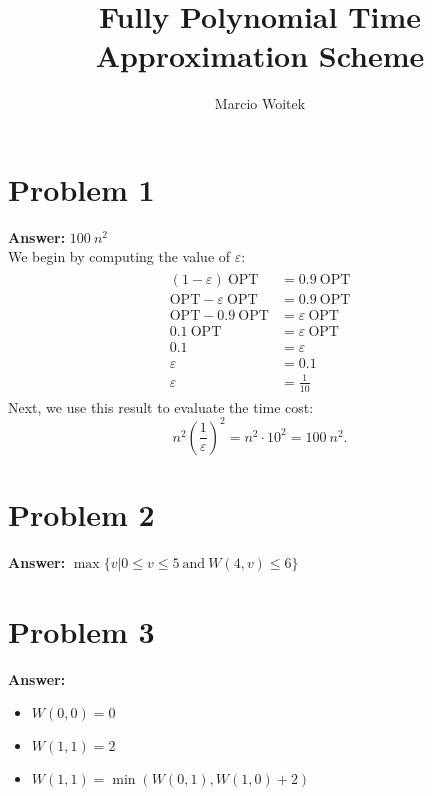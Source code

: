\documentclass[11pt]{article}
\author{Marcio Woitek}
\date{}
\title{Fully Polynomial Time Approximation Scheme}
\newcommand{\opt}{\mathrm{OPT}}
\begin{document}
\maketitle
\thispagestyle{empty}
\pagestyle{empty}
\section*{Problem 1}
\label{sec:orgbf06dd6}
\textbf{Answer:} \(100\:n^2\)\\

We begin by computing the value of \(\varepsilon\):
\begin{align}
  \begin{split}
    (1-\varepsilon)\:\opt&=0.9\:\opt\\
    \opt-\varepsilon\:\opt&=0.9\:\opt\\
    \opt-0.9\:\opt&=\varepsilon\:\opt\\
    0.1\:\opt&=\varepsilon\:\opt\\
    0.1&=\varepsilon\\
    \varepsilon&=0.1\\
    \varepsilon&=\frac{1}{10}
  \end{split}
\end{align}
Next, we use this result to evaluate the time cost:
\begin{equation}
n^2\left(\frac{1}{\varepsilon}\right)^2=n^2\cdot 10^2=100\:n^2.
\end{equation}
\section*{Problem 2}
\label{sec:orgbb904ce}
\textbf{Answer:} \(\max\{v|0\leq v\leq 5\:\mathrm{and}\:W(4,v)\leq 6\}\)
\section*{Problem 3}
\label{sec:org084b2e7}
\textbf{Answer:}
\begin{itemize}
\item \(W(0,0)=0\)
\item \(W(1,1)=2\)
\item \(W(1,1)=\min(W(0,1),W(1,0)+2)\)\\
\end{itemize}
\end{document}
